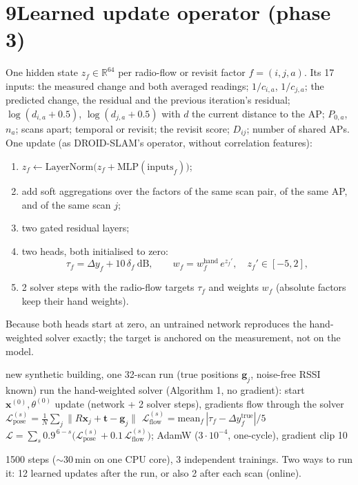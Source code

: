 \documentclass[11pt]{article}
\newcommand{\x}{\mathbf{x}}
\newcommand{\g}{\mathbf{g}}
\begin{document}
\section*{9\quad Learned update operator (phase 3)}
One hidden state $z_f\in\mathbb{R}^{64}$ per radio-flow or revisit factor $f=(i,j,a)$. Its 17 inputs: the
measured change and both averaged readings; $1/c_{i,a}$, $1/c_{j,a}$; the predicted change, the residual and
the previous iteration's residual; $\log(d_{i,a}+0.5)$, $\log(d_{j,a}+0.5)$ with $d$ the current distance to the
AP; $P_{0,a}$, $n_a$; scans apart; temporal or revisit; the revisit score; $D_{ij}$; number of shared APs.
One update (as DROID-SLAM's operator, without correlation features):
\begin{enumerate}
\item $z_f\gets\mathrm{LayerNorm}\big(z_f+\mathrm{MLP}(\text{inputs}_f)\big)$;
\item add soft aggregations over the factors of the same scan pair, of the same AP, and of the same scan $j$;
\item two gated residual layers;
\item two heads, both initialised to zero:
\begin{equation}
\tau_f=\Delta y_f+10\,\delta_f\ \text{dB},\qquad w_f=w^{\text{hand}}_f\,e^{z_f'},\quad z_f'\in[-5,2],
\end{equation}
\item 2 solver steps with the radio-flow targets $\tau_f$ and weights $w_f$ (absolute factors keep their hand weights).
\end{enumerate}
Because both heads start at zero, an untrained network reproduces the hand-weighted solver exactly; the
target is anchored on the measurement, not on the model.

\begin{algorithm}[h]
\caption{One training step (DROID-SLAM's recipe on synthetic buildings)}
\begin{algorithmic}[1]
\State new synthetic building, one 32-scan run (true positions $\g_j$, noise-free RSSI known)
\State run the hand-weighted solver (Algorithm 1, no gradient): start $\x^{(0)},\theta^{(0)}$
  \State update (network + 2 solver steps), gradients flow through the solver
  \State $\mathcal{L}^{(s)}_{\text{pose}}=\frac1N\sum_j\lVert R\x_j+\mathbf{t}-\g_j\rVert$ 
  \State $\mathcal{L}^{(s)}_{\text{flow}}=\text{mean}_f\,|\tau_f-\Delta y^{\text{true}}_f|/5$
\EndFor
\State $\mathcal{L}=\sum_s0.9^{\,6-s}\big(\mathcal{L}^{(s)}_{\text{pose}}+0.1\,\mathcal{L}^{(s)}_{\text{flow}}\big)$; AdamW ($3\cdot10^{-4}$, one-cycle), gradient clip 10
\end{algorithmic}
\end{algorithm}
1500 steps ($\sim$30\,min on one CPU core), 3 independent trainings. Two ways to run it: 12 learned updates
after the run, or also 2 after each scan (online).
\end{document}
